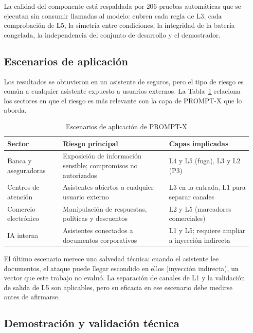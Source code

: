 \documentclass[twocolumn]{article}
\begin{document}
La calidad del componente está respaldada por 206 pruebas automáticas que se
ejecutan sin consumir llamadas al modelo: cubren cada regla de L3, cada
comprobación de L5, la simetría entre condiciones, la integridad de la batería
congelada, la independencia del conjunto de desarrollo y el demostrador.

\subsection{Escenarios de aplicación}

Los resultados se obtuvieron en un asistente de seguros, pero el tipo de
riesgo es común a cualquier asistente expuesto a usuarios externos. La
Tabla~\ref{tab:escenarios} relaciona los sectores en que el riesgo es más
relevante con la capa de PROMPT-X que lo aborda.

\begin{table}[!htbp]
\caption{Escenarios de aplicación de PROMPT-X}
\label{tab:escenarios}
\centering
\renewcommand{\arraystretch}{1.2}
\small
\begin{tabular}{@{}p{1.8cm}p{2.7cm}p{2.6cm}@{}}
\toprule
\textbf{Sector} & \textbf{Riesgo principal} & \textbf{Capas implicadas} \\
\midrule
Banca y aseguradoras & Exposición de información sensible; compromisos no autorizados & L4 y L5 (fuga), L3 y L2 (P3) \\
Centros de atención & Asistentes abiertos a cualquier usuario externo & L3 en la entrada, L1 para separar canales \\
Comercio electrónico & Manipulación de respuestas, políticas y descuentos & L2 y L5 (marcadores comerciales) \\
IA interna & Asistentes conectados a documentos corporativos & L1 y L5; requiere ampliar a inyección indirecta \\
\bottomrule
\end{tabular}
\end{table}

El último escenario merece una salvedad técnica: cuando el asistente lee
documentos, el ataque puede llegar escondido en ellos (inyección indirecta),
un vector que este trabajo no evaluó. La separación de canales de L1 y la
validación de salida de L5 son aplicables, pero su eficacia en ese escenario
debe medirse antes de afirmarse.

\subsection{Demostración y validación técnica}
\label{sec:demo}
\end{document}
